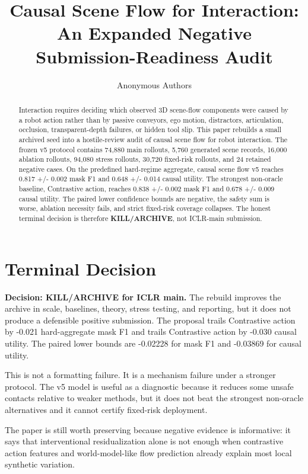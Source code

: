 \documentclass{article}
\title{Causal Scene Flow for Interaction:\\An Expanded Negative Submission-Readiness Audit}
\author{Anonymous Authors}
\newcommand{\methodname}{causal scene flow v5}
\begin{document}
\maketitle

\begin{abstract}

Interaction requires deciding which observed 3D scene-flow components were caused by a robot action rather than by passive conveyors, ego motion, distractors, articulation, occlusion, transparent-depth failures, or hidden tool slip. This paper rebuilds a small archived seed into a hostile-review audit of causal scene flow for robot interaction. The frozen v5 protocol contains 74,880 main rollouts, 5,760 generated scene records, 16,000 ablation rollouts, 94,080 stress rollouts, 30,720 fixed-risk rollouts, and 24 retained negative cases. On the predefined hard-regime aggregate, \methodname{} reaches 0.817 +/- 0.002 mask F1 and 0.648 +/- 0.014 causal utility. The strongest non-oracle baseline, Contrastive action, reaches 0.838 +/- 0.002 mask F1 and 0.678 +/- 0.009 causal utility. The paired lower confidence bounds are negative, the safety sum is worse, ablation necessity fails, and strict fixed-risk coverage collapses. The honest terminal decision is therefore \textbf{KILL/ARCHIVE}, not ICLR-main submission.

\end{abstract}

\section{Terminal Decision}

\textbf{Decision: KILL/ARCHIVE for ICLR main.} The rebuild improves the archive in scale, baselines, theory, stress testing, and reporting, but it does not produce a defensible positive submission. The proposal trails Contrastive action by -0.021 hard-aggregate mask F1 and trails Contrastive action by -0.030 causal utility. The paired lower bounds are -0.02228 for mask F1 and -0.03869 for causal utility.

This is not a formatting failure. It is a mechanism failure under a stronger protocol. The v5 model is useful as a diagnostic because it reduces some unsafe contacts relative to weaker methods, but it does not beat the strongest non-oracle alternatives and it cannot certify fixed-risk deployment.

The paper is still worth preserving because negative evidence is informative: it says that interventional residualization alone is not enough when contrastive action features and world-model-like flow prediction already explain most local synthetic variation.
\end{document}
